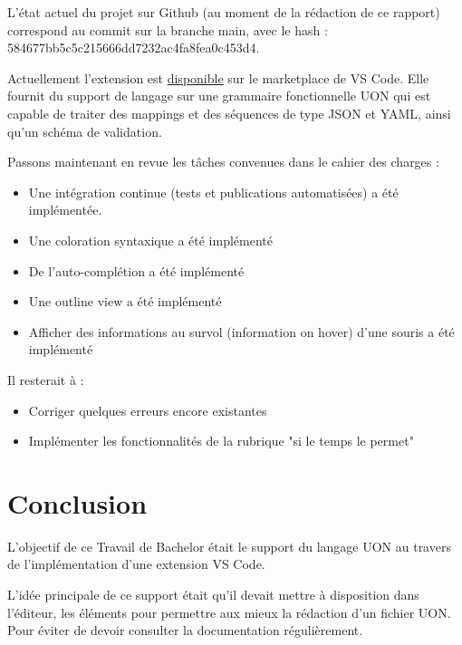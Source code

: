 \documentclass[
    iict, %
    il, %
]{heig-tb}
\begin{document}
L'état actuel du projet sur Github (au moment de la rédaction de ce rapport) correspond au commit sur la branche main, avec le hash : 584677bb5c5c215666dd7232ac4fa8fea0c453d4.

Actuellement l'extension est \href{https://marketplace.visualstudio.com/items?itemName=vitorva.vscode-uon}{disponible} sur le marketplace de VS Code.
Elle fournit du support de langage sur une grammaire fonctionnelle UON qui est capable de traiter des mappings et des séquences de type JSON et YAML, ainsi qu'un schéma de validation.

Passons maintenant en revue les tâches convenues dans le cahier des charges :

\begin{itemize}
    \item Une intégration continue (tests et publications automatisées) a été implémentée.
    \item Une coloration syntaxique a été implémenté
    \item De l'auto-complétion a été implémenté
    \item Une outline view a été implémenté
    \item Afficher des informations au survol (information on hover) d'une souris a été implémenté
\end{itemize}

Il resterait à :

\begin{itemize}
    \item Corriger quelques erreurs encore existantes
    \item Implémenter les fonctionnalités de la rubrique "si le temps le permet"
\end{itemize}

\chapter{Conclusion}



L'objectif de ce Travail de Bachelor était le support du langage UON au travers de l'implémentation d'une extension VS Code.

L'idée principale de ce support était qu'il devait mettre à disposition dans l'éditeur, les éléments pour permettre aux mieux la rédaction d'un fichier UON.
Pour éviter de devoir consulter la documentation régulièrement.
\end{document}
